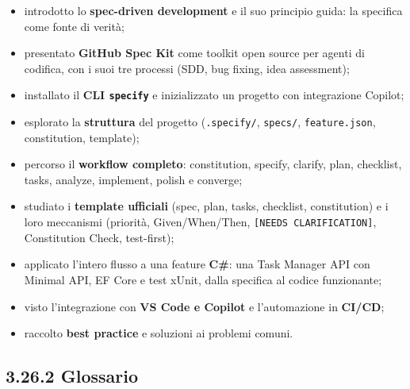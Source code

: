 \documentclass[
  italian,
  10pt,
]{book}
\providecommand{\tightlist}{%
  \setlength{\itemsep}{0pt}\setlength{\parskip}{0pt}}
\begin{document}
\begin{itemize}
\tightlist
\item
  introdotto lo \textbf{spec-driven development} e il suo principio
  guida: la specifica come fonte di verità;
\item
  presentato \textbf{GitHub Spec Kit} come toolkit open source per
  agenti di codifica, con i suoi tre processi (SDD, bug fixing, idea
  assessment);
\item
  installato il \textbf{CLI \texttt{specify}} e inizializzato un
  progetto con integrazione Copilot;
\item
  esplorato la \textbf{struttura} del progetto (\texttt{.specify/},
  \texttt{specs/}, \texttt{feature.json}, constitution, template);
\item
  percorso il \textbf{workflow completo}: constitution, specify,
  clarify, plan, checklist, tasks, analyze, implement, polish e
  converge;
\item
  studiato i \textbf{template ufficiali} (spec, plan, tasks, checklist,
  constitution) e i loro meccanismi (priorità, Given/When/Then,
  \texttt{{[}NEEDS\ CLARIFICATION{]}}, Constitution Check, test-first);
\item
  applicato l'intero flusso a una feature \textbf{C\#}: una Task Manager
  API con Minimal API, EF Core e test xUnit, dalla specifica al codice
  funzionante;
\item
  visto l'integrazione con \textbf{VS Code e Copilot} e l'automazione in
  \textbf{CI/CD};
\item
  raccolto \textbf{best practice} e soluzioni ai problemi comuni.
\end{itemize}

\subsection{3.26.2 Glossario}\label{glossario-2}
\end{document}
